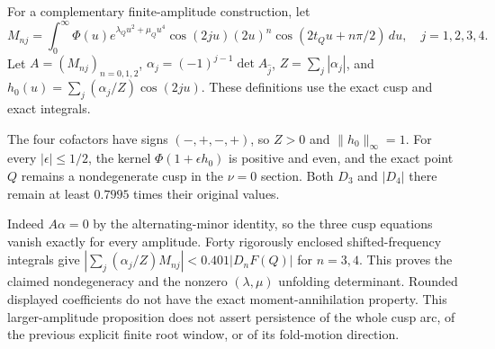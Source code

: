 For a complementary finite-amplitude construction, let
\[
 M_{nj}=\int_0^\infty\Phi(u)e^{\lambda_Qu^2+\mu_Qu^4}
 \cos(2ju)(2u)^n\cos(2t_Qu+n\pi/2)\,du,
 \quad j=1,2,3,4.
\]
Let $A=(M_{nj})_{n=0,1,2}$, $\alpha_j=(-1)^{j-1}\det A_{\widehat j}$,
$Z=\sum_j|\alpha_j|$, and $h_0(u)=\sum_j(\alpha_j/Z)\cos(2ju)$.
These definitions use the exact cusp and exact integrals.

\begin{proposition}
The four cofactors have signs $(-,+,-,+)$, so $Z>0$ and
$\|h_0\|_\infty=1$. For every $|\epsilon|\le1/2$, the kernel
$\Phi(1+\epsilon h_0)$ is positive and even, and the exact point $Q$
remains a nondegenerate cusp in the $\nu=0$ section. Both $D_3$ and
$|D_4|$ there remain at least $0.7995$ times their original values.
\end{proposition}

Indeed $A\alpha=0$ by the alternating-minor identity, so the three
cusp equations vanish exactly for every amplitude. Forty rigorously
enclosed shifted-frequency integrals give
$|\sum_j(\alpha_j/Z)M_{nj}|<0.401|D_nF(Q)|$ for $n=3,4$.
This proves the claimed nondegeneracy and the nonzero $(\lambda,\mu)$
unfolding determinant. Rounded displayed coefficients do not have the
exact moment-annihilation property. This larger-amplitude proposition
does not assert persistence of the whole cusp arc, of the previous
explicit finite root window, or of its fold-motion direction.
